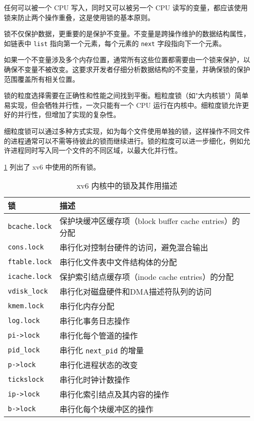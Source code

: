 任何可以被一个 CPU 写入，同时又可以被另一个 CPU 读写的变量，都应该使用锁来防止两个操作重叠，这是使用锁的基本原则。

锁不仅保护数据，更重要的是保护不变量。不变量是跨操作维护的数据结构属性，如链表中 \texttt{list} 指向第一个元素，每个元素的 \texttt{next} 字段指向下一个元素。

如果一个不变量涉及多个内存位置，通常所有这些位置都需要由一个锁来保护，以确保不变量不被改变。这要求开发者仔细分析数据结构的不变量，并确保锁的保护范围覆盖所有相关位置。

锁的粒度选择需要在正确性和性能之间找到平衡。粗粒度锁（如"大内核锁"）简单易实现，但会牺牲并行性，一次只能有一个 CPU 运行在内核中。细粒度锁允许更好的并行性，但增加了实现的复杂性。

细粒度锁可以通过多种方式实现，如为每个文件使用单独的锁，这样操作不同文件的进程通常可以不需等待彼此的锁而继续进行。锁的粒度可以进一步细化，例如允许进程同时写入同一个文件的不同区域，以最大化并行性。

\cref{tab:xv6_locks} 列出了 xv6 中使用的所有锁。

\begin{table}[!hpt]
	\caption{xv6 内核中的锁及其作用描述}
	\label{tab:xv6_locks}
	\centering
	\begin{tabular}{@{}ll@{}} 		
		\toprule
		\textbf{锁} & \textbf{描述} \\
		\midrule
		\texttt{bcache.lock} & 保护块缓冲区缓存项（block buffer cache entries）的分配 \\
		\texttt{cons.lock} & 串行化对控制台硬件的访问，避免混合输出 \\
		\texttt{ftable.lock} & 串行化文件表中文件结构体的分配 \\
		\texttt{icache.lock} & 保护索引结点缓存项（inode cache entries）的分配 \\
		\texttt{vdisk\_lock} & 串行化对磁盘硬件和DMA描述符队列的访问 \\
		\texttt{kmem.lock} & 串行化内存分配 \\
		\texttt{log.lock} & 串行化事务日志操作 \\
		\texttt{pi->lock} & 串行化每个管道的操作 \\
		\texttt{pid\_lock} & 串行化 \texttt{next\_pid} 的增量 \\
		\texttt{p->lock} & 串行化进程状态的改变 \\
		\texttt{tickslock} & 串行化时钟计数操作 \\
		\texttt{ip->lock} & 串行化索引结点及其内容的操作 \\
		\texttt{b->lock} & 串行化每个块缓冲区的操作 \\
		\bottomrule
	\end{tabular}
\end{table}

